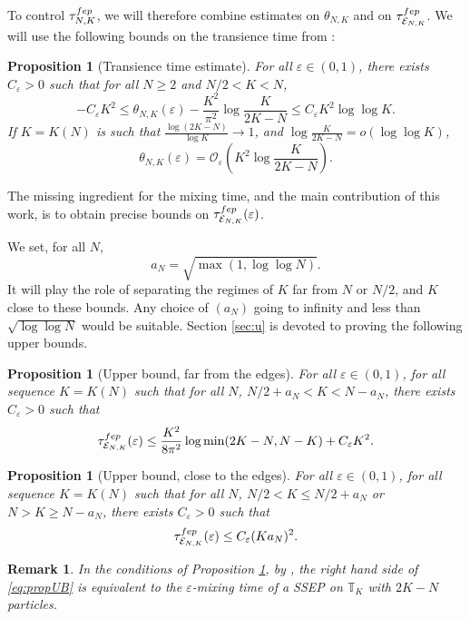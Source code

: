 \documentclass[11pt,a4paper]{article}
\newcommand{\T}{\mathbb{T}}
\newcommand{\FEP}{\textsc{fep}}
\newtheorem{proposition}[theorem]{Proposition}
\newtheorem{remark}{Remark}[section]
\newcommand{\eqs}[1]{\begin{equation}#1\end{equation}}
\newcommand{\eq}[2]{\begin{equation}\label{#1}#2\end{equation}}
\begin{document}
To control $\tau_{N,K}^{\FEP}$, we will therefore combine estimates on $\theta_{N,K}$ and on $\tau^{\FEP}_{\mathcal{E}_{N,K}}$. We will use the following bounds on the transience time from \cite{erignoux_cutoff_2024}:

\begin{proposition}[Transience time estimate]\label{prop:t} \cite[Lemma 4.5, Remark 9]{erignoux_cutoff_2024} For all $\varepsilon \in (0,1)$, there exists $C_{\varepsilon}>0$ such that for all $N\ge 2$ and $N/2<K<N$,
\eq{eq:transience}{ -C_{\varepsilon} K^2 \le \theta_{N,K}(\varepsilon) - \frac{K^2}{\pi^2} \log \frac{K}{2K-N}\le C_{\varepsilon} K^2 \log\log K.}
If $K = K(N)$ is such that $\frac{\log (2K-N)}{\log K} \longrightarrow 1$, and $\log\frac{K}{2K-N}=o(\log\log K)$,
\eq{eq:transience_short}{\theta_{N,K}(\varepsilon) =\mathcal{O}_{\varepsilon} \left(K^2 \log \frac{K}{2K-N}\right).}
\end{proposition}
The missing ingredient for the mixing time, and the main contribution of this work, is to obtain precise bounds on $\tau_{\mathcal{E}_{N,K} }^{\FEP}(\varepsilon)$.

We set, for all $N$, 
\eqs{a_N = \sqrt{\max(1, \log\log N)}.} It will play the role of separating the regimes of $K$ far from $N$ or $N/2$, and $K$ close to these bounds. Any choice of $(a_N)$ going to infinity and less than $\sqrt{\log\log N}$ would be suitable. Section \ref{sec:u} is devoted to proving the following upper bounds. 
\begin{proposition}[Upper bound, far from the edges] \label{prop:UB}
For all $\varepsilon \in (0,1)$, for all sequence $K=K(N)$ such that for all $N$, $N/2 + a_N < K < N - a_N$, there exists $C_\varepsilon > 0$ such that
\eq{eq:propUB}{\tau^{\FEP}_{\mathcal{E}_{N,K}}(\varepsilon) \le \frac{K^2}{8\pi^2}\log\min(2K-N,N-K) + C_\varepsilon K^2.}
\end{proposition}
\begin{proposition}[Upper bound, close to the edges] \label{prop:UBc}
For all $\varepsilon \in (0,1)$, for all sequence $K=K(N)$ such that for all $N$, $N/2 < K \le N/2 + a_N$ or $N > K \ge N - a_N$, there exists $C_\varepsilon > 0$ such that
\eq{eq:propUBc}{\tau^{\FEP}_{\mathcal{E}_{N,K}}(\varepsilon) \le  C_\varepsilon (Ka_N)^2.}
\end{proposition}
\begin{remark}
In the conditions of Proposition \ref{prop:UB},  by \cite{lacoin_simple_2017}, the right hand side of \eqref{eq:propUB} is equivalent to the $\varepsilon$-mixing time of a SSEP on $\T_K$ with $2K-N$ particles. 
\end{remark}
\end{document}
